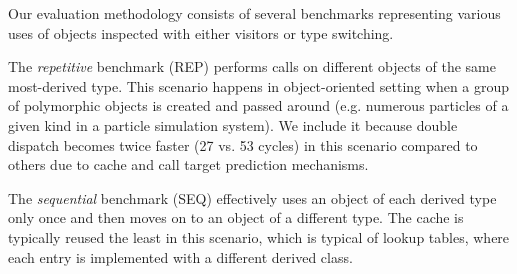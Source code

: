 
Our evaluation methodology consists of several benchmarks representing various 
uses of objects inspected with either visitors or type switching.

The \emph{repetitive} benchmark (REP) performs calls on different objects of the 
same most-derived type. This scenario happens in object-oriented setting when a 
group of polymorphic objects is created and passed around (e.g. numerous 
particles of a given kind in a particle simulation system). We include it 
because double dispatch becomes twice faster (27 vs. 53 cycles) in this 
scenario compared to others due to cache and call target prediction mechanisms. 

The \emph{sequential} benchmark (SEQ) effectively uses an object of each derived type only 
once and then moves on to an object of a different type. The cache is typically 
reused the least in this scenario, which is typical of lookup tables, where each 
entry is implemented with a different derived class.

